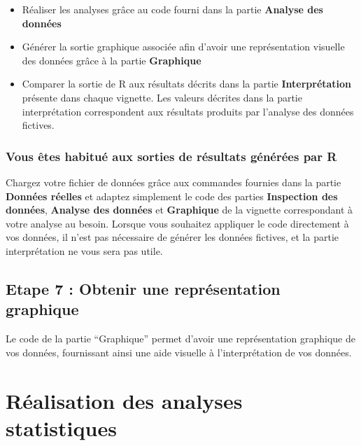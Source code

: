 \documentclass[
]{book}
\providecommand{\tightlist}{%
  \setlength{\itemsep}{0pt}\setlength{\parskip}{0pt}}
\begin{document}
\begin{itemize}
\tightlist
\item
  Réaliser les analyses grâce au code fourni dans la partie \textbf{Analyse des données}
\item
  Générer la sortie graphique associée afin d'avoir une représentation visuelle des données grâce à la partie \textbf{Graphique}
\item
  Comparer la sortie de R aux résultats décrits dans la partie \textbf{Interprétation} présente dans chaque vignette. Les valeurs décrites dans la partie interprétation correspondent aux résultats produits par l'analyse des données fictives.
\end{itemize}

\hypertarget{vous-uxeates-habituuxe9-aux-sorties-de-ruxe9sultats-guxe9nuxe9ruxe9es-par-r}{%
\subsection{Vous êtes habitué aux sorties de résultats générées par R}\label{vous-uxeates-habituuxe9-aux-sorties-de-ruxe9sultats-guxe9nuxe9ruxe9es-par-r}}

Chargez votre fichier de données grâce aux commandes fournies dans la partie \textbf{Données réelles} et adaptez simplement le code des parties \textbf{Inspection des données}, \textbf{Analyse des données} et \textbf{Graphique} de la vignette correspondant à votre analyse au besoin. Lorsque vous souhaitez appliquer le code directement à vos données, il n'est pas nécessaire de générer les données fictives, et la partie interprétation ne vous sera pas utile.

\hypertarget{etape-7-obtenir-une-repruxe9sentation-graphique}{%
\section{Etape 7 : Obtenir une représentation graphique}\label{etape-7-obtenir-une-repruxe9sentation-graphique}}

Le code de la partie ``Graphique'' permet d'avoir une représentation graphique de vos données, fournissant ainsi une aide visuelle à l'interprétation de vos données.

\hypertarget{ruxe9alisation-des-analyses-statistiques}{%
\chapter{Réalisation des analyses statistiques}\label{ruxe9alisation-des-analyses-statistiques}}
\end{document}
